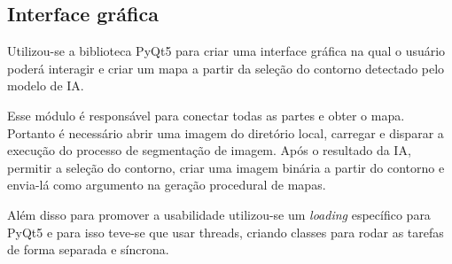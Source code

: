 

\subsection{Interface gráfica}

Utilizou-se a biblioteca PyQt5 para criar uma interface gráfica na qual o usuário poderá interagir e criar um mapa a partir da seleção do contorno detectado pelo modelo de IA.

Esse módulo é responsável para conectar todas as partes e obter o mapa. Portanto é necessário abrir uma imagem do diretório local, carregar e disparar a execução do processo de segmentação de imagem. Após o resultado da IA, permitir a seleção do contorno,  criar uma imagem binária a partir do contorno e envia-lá como argumento na geração procedural de mapas.

Além disso para promover a usabilidade utilizou-se um \textit{loading} específico para PyQt5 e para isso teve-se que usar threads, criando classes para rodar as tarefas de forma separada e síncrona.
